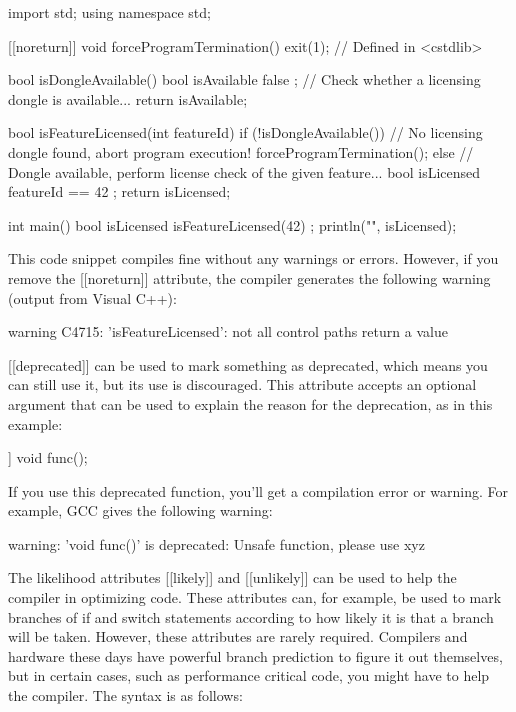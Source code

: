 \begin{cpp}
import std;
using namespace std;

[[noreturn]] void forceProgramTermination()
{
    exit(1); // Defined in <cstdlib>
}

bool isDongleAvailable()
{
    bool isAvailable { false };
    // Check whether a licensing dongle is available...
    return isAvailable;
}

bool isFeatureLicensed(int featureId)
{
    if (!isDongleAvailable()) {
        // No licensing dongle found, abort program execution!
        forceProgramTermination();
    } else {
        // Dongle available, perform license check of the given feature...
        bool isLicensed { featureId == 42 };
        return isLicensed;
    }
}

int main()
{
    bool isLicensed { isFeatureLicensed(42) };
    println("{}", isLicensed);
}
\end{cpp}

This code snippet compiles fine without any warnings or errors. However, if you remove the [[noreturn]] attribute, the compiler generates the following warning (output from Visual C++):

\begin{shell}
warning C4715: 'isFeatureLicensed': not all control paths return a value
\end{shell}

\mySamllsection{[[deprecated]]}

[[deprecated]] can be used to mark something as deprecated, which means you can still use it, but its use is discouraged. This attribute accepts an optional argument that can be used to explain the reason for the deprecation, as in this example:

\begin{cpp}
[[deprecated("Unsafe function, please use xyz")]] void func();
\end{cpp}

If you use this deprecated function, you’ll get a compilation error or warning. For example, GCC gives the following warning:

\begin{shell}
warning: 'void func()' is deprecated: Unsafe function, please use xyz
\end{shell}


The likelihood attributes [[likely]] and [[unlikely]] can be used to help the compiler in optimizing code. These attributes can, for example, be used to mark branches of if and switch statements according to how likely it is that a branch will be taken. However, these attributes are rarely required. Compilers and hardware these days have powerful branch prediction to figure it out themselves, but in certain cases, such as performance critical code, you might have to help the compiler. The syntax is as follows:

